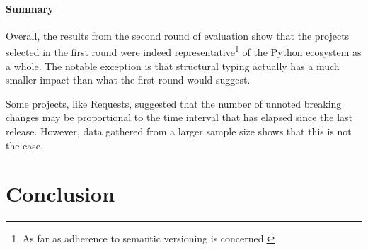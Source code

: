 \documentclass{l4proj}
\begin{document}
\subsubsection{Summary}

Overall, the results from the second round of evaluation show that the
projects selected in the first round were indeed
representative\footnote{As far as adherence to semantic versioning is
concerned.} of the Python ecosystem as a whole. The notable exception
is that structural typing actually has a much smaller impact than what
the first round would suggest.

Some projects, like Requests, suggested that the number of unnoted
breaking changes may be proportional to the time interval that has
elapsed since the last release. However, data gathered from a larger
sample size shows that this is not the case.



\chapter{Conclusion}
\label{Conclusion}




\end{document}
